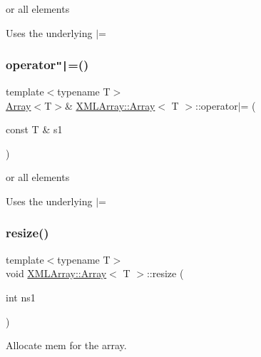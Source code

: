 or all elements 

Uses the underlying $\vert$= \mbox{\label{classXMLArray_1_1Array_a719213ff71df03fd3e561d1d4f9656cc}} 
\subsubsection{\texorpdfstring{operator\texttt{"|}=()}{operator|=()}\hspace{0.1cm}{\footnotesize\ttfamily [4/4]}}
{\footnotesize\ttfamily template$<$typename T$>$ \\
\mbox{\hyperlink{classXMLArray_1_1Array}{Array}}$<$T$>$\& \mbox{\hyperlink{classXMLArray_1_1Array}{X\+M\+L\+Array\+::\+Array}}$<$ T $>$\+::operator$\vert$= (\begin{DoxyParamCaption}\item[{const T \&}]{s1 }\end{DoxyParamCaption})\hspace{0.3cm}{\ttfamily [inline]}}



or all elements 

Uses the underlying $\vert$= \mbox{\label{classXMLArray_1_1Array_a470913fde270ad0e578041654e2390f0}} 
\subsubsection{\texorpdfstring{resize()}{resize()}\hspace{0.1cm}{\footnotesize\ttfamily [1/2]}}
{\footnotesize\ttfamily template$<$typename T$>$ \\
void \mbox{\hyperlink{classXMLArray_1_1Array}{X\+M\+L\+Array\+::\+Array}}$<$ T $>$\+::resize (\begin{DoxyParamCaption}\item[{int}]{ns1 }\end{DoxyParamCaption})\hspace{0.3cm}{\ttfamily [inline]}}



Allocate mem for the array. 

